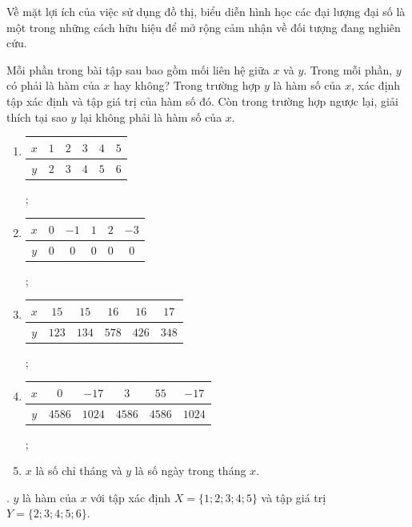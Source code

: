 Về mặt lợi ích của việc sử dụng đồ thị, biểu diễn hình học các đại lượng đại số là một trong những cách hữu hiệu để mở rộng cảm nhận về đối tượng đang nghiên cứu.
      
\exercise Mỗi phần trong bài tập sau bao gồm mối liên hệ giữa $x$ và $y$. Trong mỗi phần, $y$ có phải là hàm của $x$ hay không? Trong trường hợp $y$ là hàm số của $x$, xác định tập xác định và tập giá trị của hàm số đó. Còn trong trường hợp ngược lại, giải thích tại sao $y$ lại không phải là hàm số của $x$.

\begin{enumerate}
   \item \begin{tabular}{|c|c|c|c|c|c|}
      \hline
      $x$ & $1$ & $2$ & $3$ & $4$ & $5$ \\
      \hline
      $y$ & $2$ & $3$ & $4$ & $5$ & $6$ \\
      \hline
   \end{tabular};
   \item \begin{tabular}{|c|c|c|c|c|c|}
      \hline
      $x$ & $0$ & $-1$ & $1$ & $2$ & $-3$ \\
      \hline
      $y$ & $0$ & $0$ & $0$ & $0$ & $0$ \\
      \hline
   \end{tabular};
   \item \begin{tabular}{|c|c|c|c|c|c|}
      \hline
      $x$ & $15$ & $15$ & $16$ & $16$ & $17$ \\
      \hline
      $y$ & $123$ & $134$ & $578$ & $426$ & $348$ \\
      \hline
   \end{tabular};
   \item \begin{tabular}{|c|c|c|c|c|c|}
      \hline
      $x$ & $0$ & $-17$ & $3$ & $55$ & $-17$ \\
      \hline
      $y$ & $4586$ & $1024$ & $4586$ & $4586$ & $1024$ \\
      \hline
   \end{tabular};
   \item $x$ là số chỉ tháng và $y$ là số ngày trong tháng $x$.
\end{enumerate}

\solution

\setcounter{subexercise}{1}
. $y$ là hàm của $x$ với tập xác định $X = \{1; 2; 3; 4; 5\}$ và tập giá trị $Y = \{2; 3; 4; 5; 6\}$.

